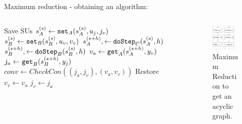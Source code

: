 \documentclass{beamer}
\begin{document}
\begin{frame}{Maximum reduction - obtaining an algorithm:}
    \begin{columns}[T] %
        \begin{column}{.48\textwidth}
            \begin{algorithm}[H]
                \begin{algorithmic}
                  \scriptsize
                  \State Save SUs   
                  \State $s_{A}^{(s)} \gets \mathtt{set}_{A}(s_{A}^{(s)}, u_{j}, j_v)$
                  \State $s_{B}^{(s)} \gets \mathtt{set}_{B}(s_{B}^{(s)}, u_{v}, v_v)$
                  \State $s_{A}^{(s+h)}, \gets \mathtt{doStep}_{C}(s_{A}^{(s)}, h)$
                  \State $s_{B}^{(s+h)}, \gets \mathtt{doStep}_{B}(s_{B}^{(s)}, h)$
                  \State $v_a \gets \mathtt{get}_{A}(s_{A}^{(s+h)}, y_{v})$
                  \State $j_a \gets \mathtt{get}_{B}(s_{B}^{(s+h)}, y_{j})$
                  \State $conv \gets CheckCon((j_a, j_v),(v_a, v_v))$
                      \State Restore     
                  \EndIf
                  \State $v_v \gets v_a$
                  \State $j_v \gets j_a$
              \EndWhile
              \end{algorithmic}
              \caption{}
              \end{algorithm}
    \end{column}%
    \hfill%
    \begin{column}{.48\textwidth}
        \begin{figure}    
            \includegraphics[width=0.8\textwidth]{images/jacobian_reduced_graph.pdf}
            \caption{Maximum Reduction to get an acyclic graph.}
        \end{figure}
    \end{column}%
    \end{columns}    
\end{frame}
\end{document}
